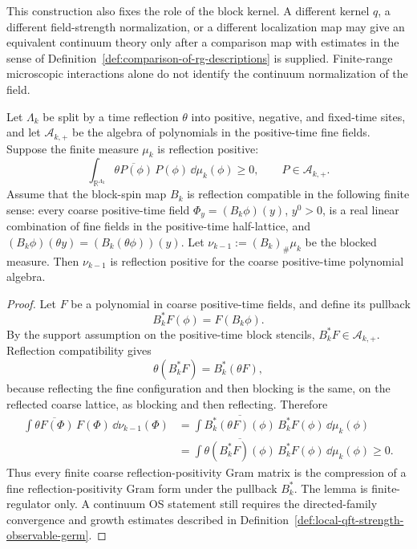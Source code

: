 This construction also fixes the role of the block kernel.  A different
kernel \(q\), a different field-strength normalization, or a different
localization map may give an equivalent continuum theory only after a
comparison map with estimates in the sense of
Definition~\ref{def:comparison-of-rg-descriptions} is supplied.  Finite-range
microscopic interactions alone do not identify the continuum normalization
of the field.

\begin{lemma}
\label{lem:reflection-positive-block-spin-pullback}
Let \(\Lambda_k\) be split by a time reflection \(\theta\) into positive,
negative, and fixed-time sites, and let \(\mathcal A_{k,+}\) be the algebra
of polynomials in the positive-time fine fields.  Suppose the finite measure
\(\mu_k\) is reflection positive:
\[
  \int_{\mathbb R^{\Lambda_k}}
  \overline{\theta P(\phi)}\,P(\phi)\,\dd\mu_k(\phi)\ge0,
  \qquad P\in\mathcal A_{k,+}.
\]
Assume that the block-spin map \(B_k\) is reflection compatible in the
following finite sense: every coarse positive-time field
\(\Phi_y=(B_k\phi)(y)\), \(y^0>0\), is a real linear combination of fine
fields in the positive-time half-lattice, and
\((B_k\phi)(\theta y)=(B_k(\theta\phi))(y)\).  Let
\(\nu_{k-1}:=(B_k)_\#\mu_k\) be the blocked measure.  Then \(\nu_{k-1}\) is
reflection positive for the coarse positive-time polynomial algebra.
\end{lemma}

\begin{proof}
Let \(F\) be a polynomial in coarse positive-time fields, and define its
pullback
\[
  B_k^\ast F(\phi)=F(B_k\phi).
\]
By the support assumption on the positive-time block stencils,
\(B_k^\ast F\in\mathcal A_{k,+}\).  Reflection compatibility gives
\[
  \theta(B_k^\ast F)=B_k^\ast(\theta F),
\]
because reflecting the fine configuration and then blocking is the same, on
the reflected coarse lattice, as blocking and then reflecting.  Therefore
\[
\begin{aligned}
  \int \overline{\theta F(\Phi)}\,F(\Phi)\,\dd\nu_{k-1}(\Phi)
  &=
  \int \overline{B_k^\ast(\theta F)(\phi)}\,
        B_k^\ast F(\phi)\,\dd\mu_k(\phi)  \\
  &=
  \int \overline{\theta(B_k^\ast F)(\phi)}\,
        B_k^\ast F(\phi)\,\dd\mu_k(\phi)
  \ge0 .
\end{aligned}
\]
Thus every finite coarse reflection-positivity Gram matrix is the compression
of a fine reflection-positivity Gram form under the pullback \(B_k^\ast\).
The lemma is finite-regulator only.  A continuum OS statement still requires
the directed-family convergence and growth estimates described in
Definition~\ref{def:local-qft-strength-observable-germ}.
\end{proof}

